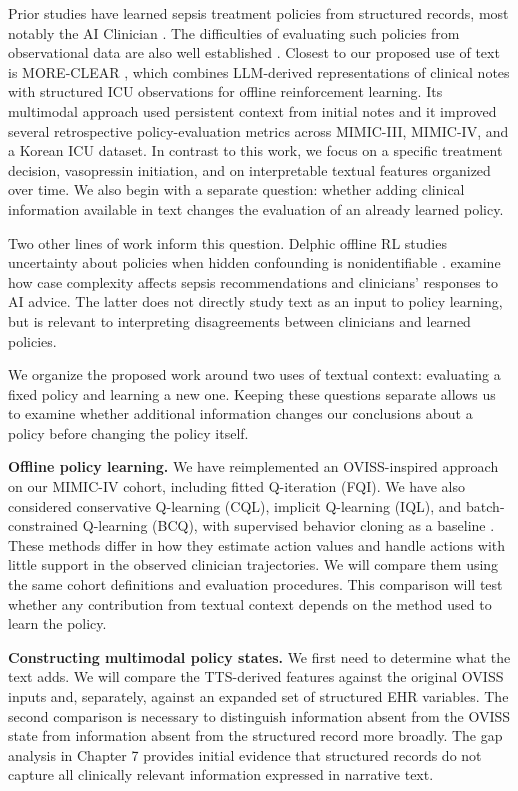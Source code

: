 Prior studies have learned sepsis treatment policies from structured records, most notably the AI Clinician \citep{komorowski2018artificial}.
The difficulties of evaluating such policies from observational data are also well established \citep{gottesman2019guidelines}.
Closest to our proposed use of text is MORE-CLEAR \citep{lim2026large}, which combines LLM-derived representations of clinical notes with structured ICU observations for offline reinforcement learning.
Its multimodal approach used persistent context from initial notes and it improved several retrospective policy-evaluation metrics across MIMIC-III, MIMIC-IV, and a Korean ICU dataset.
In contrast to this work, we focus on a specific treatment decision, vasopressin initiation, and on interpretable textual features organized over time.
We also begin with a separate question: whether adding clinical information available in text changes the evaluation of an already learned policy.

Two other lines of work inform this question.
Delphic offline RL studies uncertainty about policies when hidden confounding is nonidentifiable \citep{pace2024delphic}.
\citet{sivaraman2026indirect} examine how case complexity affects sepsis recommendations and clinicians' responses to AI advice.
The latter does not directly study text as an input to policy learning, but is relevant to interpreting disagreements between clinicians and learned policies.

We organize the proposed work around two uses of textual context: evaluating a fixed policy and learning a new one.
Keeping these questions separate allows us to examine whether additional information changes our conclusions about a policy before changing the policy itself.

\textbf{Offline policy learning.}
We have reimplemented an OVISS-inspired approach on our MIMIC-IV cohort, including fitted Q-iteration (FQI).
We have also considered conservative Q-learning (CQL), implicit Q-learning (IQL), and batch-constrained Q-learning (BCQ), with supervised behavior cloning as a baseline \citep{ernst2005tree,kumar2020conservative,kostrikov2021offline,fujimoto2019benchmarking}.
These methods differ in how they estimate action values and handle actions with little support in the observed clinician trajectories.
We will compare them using the same cohort definitions and evaluation procedures.
This comparison will test whether any contribution from textual context depends on the method used to learn the policy.

\textbf{Constructing multimodal policy states.}
We first need to determine what the text adds.
We will compare the TTS-derived features against the original OVISS inputs and, separately, against an expanded set of structured EHR variables.
The second comparison is necessary to distinguish information absent from the OVISS state from information absent from the structured record more broadly.
The gap analysis in Chapter 7 provides initial evidence that structured records do not capture all clinically relevant information expressed in narrative text.

